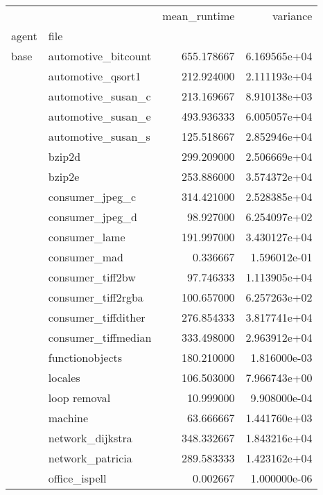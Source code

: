\begin{table*}
\begin{center}
\begin{tabular}{llrr}
\toprule
       &                                                     &  mean\_runtime &      variance \\
agent & file &               &               \\
\midrule
base & automotive\_bitcount &    655.178667 &  6.169565e+04 \\
       & automotive\_qsort1 &    212.924000 &  2.111193e+04 \\
       & automotive\_susan\_c &    213.169667 &  8.910138e+03 \\
       & automotive\_susan\_e &    493.936333 &  6.005057e+04 \\
       & automotive\_susan\_s &    125.518667 &  2.852946e+04 \\
       & bzip2d &    299.209000 &  2.506669e+04 \\
       & bzip2e &    253.886000 &  3.574372e+04 \\
       & consumer\_jpeg\_c &    314.421000 &  2.528385e+04 \\
       & consumer\_jpeg\_d &     98.927000 &  6.254097e+02 \\
       & consumer\_lame &    191.997000 &  3.430127e+04 \\
       & consumer\_mad &      0.336667 &  1.596012e-01 \\
       & consumer\_tiff2bw &     97.746333 &  1.113905e+04 \\
       & consumer\_tiff2rgba &    100.657000 &  6.257263e+02 \\
       & consumer\_tiffdither &    276.854333 &  3.817741e+04 \\
       & consumer\_tiffmedian &    333.498000 &  2.963912e+04 \\
       & functionobjects &    180.210000 &  1.816000e-03 \\
       & locales &    106.503000 &  7.966743e+00 \\
       & loop removal &     10.999000 &  9.908000e-04 \\
       & machine &     63.666667 &  1.441760e+03 \\
       & network\_dijkstra &    348.332667 &  1.843216e+04 \\
       & network\_patricia &    289.583333 &  1.423162e+04 \\
       & office\_ispell &      0.002667 &  1.000000e-06 \\

\end{tabular}
\end{center}
\end{table*}
